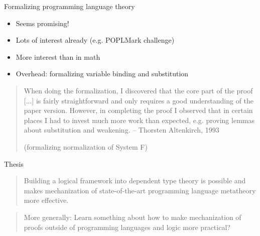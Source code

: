 \documentclass[usenames,dvipsnames]{beamer}
\begin{document}
\begin{frame}{Formalizing programming language theory}
\begin{itemize}
\item Seems promising!
\item Lots of interest already (e.g. POPLMark challenge)
\item More interest than in math
\pause
\item Overhead: formalizing variable binding and substitution
\end{itemize}
\pause
\begin{quote}
When doing the formalization, I discovered that the core part of the
proof [...] is fairly straightforward and
only requires a good understanding of the paper version. However, in
completing the proof I observed that in certain places I had to invest
much more work than expected, e.g. proving lemmas about substitution
and weakening. -- Thorsten Altenkirch, 1993

   (formalizing normalization of System F)
\end{quote}
\end{frame}

\begin{frame}{Thesis}
\begin{quote}Building a logical framework into dependent type
theory is possible and makes mechanization of state-of-the-art programming
language metatheory more effective.
\end{quote}

\pause\begin{quote}{\normalfont More generally: Learn something about how
to make mechanization of proofs outside of programming languages and
logic more practical?}\end{quote}
\end{frame}
\end{document}
